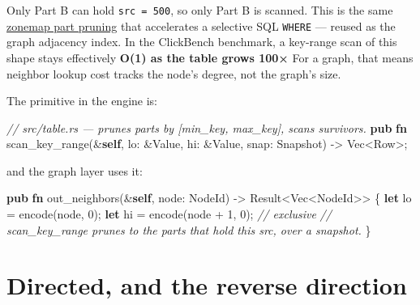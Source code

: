\documentclass[
  11pt,
  openany]{book}
\newenvironment{Shaded}{}{}
\newcommand{\CommentTok}[1]{\textcolor[rgb]{0.38,0.63,0.69}{\textit{#1}}}
\newcommand{\DataTypeTok}[1]{\textcolor[rgb]{0.56,0.13,0.00}{#1}}
\newcommand{\DecValTok}[1]{\textcolor[rgb]{0.25,0.63,0.44}{#1}}
\newcommand{\KeywordTok}[1]{\textcolor[rgb]{0.00,0.44,0.13}{\textbf{#1}}}
\newcommand{\NormalTok}[1]{#1}
\newcommand{\OperatorTok}[1]{\textcolor[rgb]{0.40,0.40,0.40}{#1}}
\begin{document}
Only Part B can hold \texttt{src\ =\ 500}, so only Part B is scanned.
This is the same \href{../engine/storage.md}{zonemap part pruning} that
accelerates a selective SQL \texttt{WHERE} --- reused as the graph
adjacency index. In the ClickBench benchmark, a key-range scan of this
shape stays effectively \textbf{O(1) as the table grows 100×} For a
graph, that means neighbor lookup cost tracks the node's degree, not the
graph's size.

The primitive in the engine is:

\begin{Shaded}
\begin{Highlighting}[]
\CommentTok{// src/table.rs — prunes parts by [min\_key, max\_key], scans survivors.}
\KeywordTok{pub} \KeywordTok{fn}\NormalTok{ scan\_key\_range(}\OperatorTok{\&}\KeywordTok{self}\OperatorTok{,}\NormalTok{ lo}\OperatorTok{:} \OperatorTok{\&}\NormalTok{Value}\OperatorTok{,}\NormalTok{ hi}\OperatorTok{:} \OperatorTok{\&}\NormalTok{Value}\OperatorTok{,}\NormalTok{ snap}\OperatorTok{:}\NormalTok{ Snapshot) }\OperatorTok{{-}\textgreater{}} \DataTypeTok{Vec}\OperatorTok{\textless{}}\NormalTok{Row}\OperatorTok{\textgreater{};}
\end{Highlighting}
\end{Shaded}

and the graph layer uses it:

\begin{Shaded}
\begin{Highlighting}[]
\KeywordTok{pub} \KeywordTok{fn}\NormalTok{ out\_neighbors(}\OperatorTok{\&}\KeywordTok{self}\OperatorTok{,}\NormalTok{ node}\OperatorTok{:}\NormalTok{ NodeId) }\OperatorTok{{-}\textgreater{}} \DataTypeTok{Result}\OperatorTok{\textless{}}\DataTypeTok{Vec}\OperatorTok{\textless{}}\NormalTok{NodeId}\OperatorTok{\textgreater{}\textgreater{}} \OperatorTok{\{}
    \KeywordTok{let}\NormalTok{ lo }\OperatorTok{=}\NormalTok{ encode(node}\OperatorTok{,} \DecValTok{0}\NormalTok{)}\OperatorTok{;}
    \KeywordTok{let}\NormalTok{ hi }\OperatorTok{=}\NormalTok{ encode(node }\OperatorTok{+} \DecValTok{1}\OperatorTok{,} \DecValTok{0}\NormalTok{)}\OperatorTok{;}        \CommentTok{// exclusive}
    \CommentTok{// scan\_key\_range prunes to the parts that hold this src, over a snapshot.}
\OperatorTok{\}}
\end{Highlighting}
\end{Shaded}

\section{Directed, and the reverse
direction}\label{directed-and-the-reverse-direction}
\end{document}
